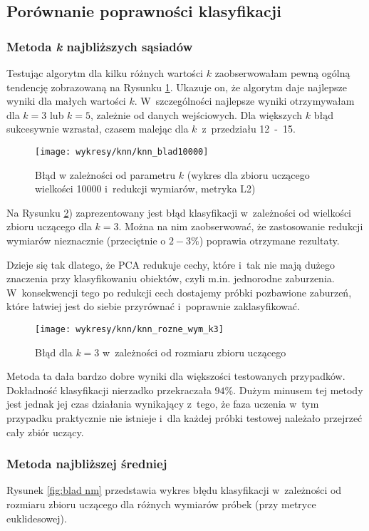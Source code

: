 \documentclass[12pt]{article}
\begin{document}
\subsection{Porównanie poprawności klasyfikacji}
\subsubsection{Metoda \emph{k} najbliższych sąsiadów}\label{sec:wyniki knn}
Testując algorytm dla kilku różnych wartości $k$ zaobserwowałam pewną ogólną tendencję zobrazowaną na Rysunku \ref{fig:falka knn}. Ukazuje on, że algorytm daje najlepsze wyniki dla małych wartości $k$. W~szczególności 
najlepsze wyniki otrzymywałam dla $k = 3$ lub $k = 5$, zależnie od danych wejściowych. Dla większych $k$ błąd sukcesywnie wzrastał, czasem malejąc dla $k$~z~przedziału 12~-~15.
\begin{figure}[H]
 \centering
 \texttt{[image: wykresy/knn/knn\_blad10000]}
 \caption{Błąd w zależności od parametru $k$ (wykres dla zbioru uczącego wielkości 10000 i~redukcji wymiarów, metryka L2)}
\label{fig:falka knn}
\end{figure}

Na Rysunku \ref{fig:pca poprawia knn}) zaprezentowany jest błąd klasyfikacji w~zależności od wielkości zbioru uczącego dla $k=3$. Można na nim zaobserwować, że zastosowanie redukcji wymiarów nieznacznie (przeciętnie o $2-3\%$) poprawia otrzymane rezultaty. 

Dzieje 
się tak dlatego, że PCA redukuje cechy, które i~tak nie mają dużego znaczenia przy klasyfikowaniu obiektów, czyli m.in. jednorodne zaburzenia. W~konsekwencji tego po redukcji cech dostajemy próbki pozbawione zaburzeń, które łatwiej jest do siebie przyrównać
i~poprawnie zaklasyfikować.
\begin{figure}[H]
 \centering
 \texttt{[image: wykresy/knn/knn\_rozne\_wym\_k3]}
 \caption{Błąd dla $k=3$ w~zależności od rozmiaru zbioru uczącego}
\label{fig:pca poprawia knn}
\end{figure}
Metoda ta dała bardzo dobre wyniki dla większości testowanych przypadków. Dokładność klasyfikacji nierzadko przekraczała $94\%$. Dużym minusem tej metody jest jednak jej czas działania wynikający z~tego, że faza uczenia w~tym przypadku praktycznie
nie istnieje i~dla każdej próbki testowej należało przejrzeć cały zbiór uczący. \\


\subsubsection{Metoda najbliższej średniej}\label{sec:nm wyniki}
Rysunek \ref{fig:blad nm} przedstawia wykres błędu klasyfikacji w~zależności od rozmiaru zbioru uczącego dla różnych wymiarów próbek (przy metryce euklidesowej). 
\end{document}
